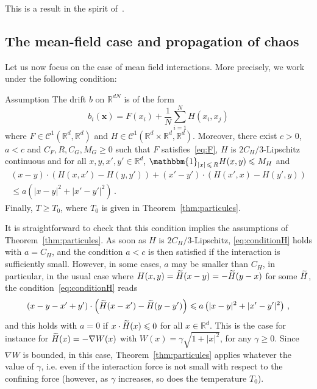 \documentclass[AHL,Unicode,longabstracts,published]{cedram}
\newcommand{\R}{\mathbb R}
\newcommand{\clC}{\mathcal C}
\newcommand{\na}{\nabla}
\newcommand{\1}{\mathbbm{1}}
\newcommand{\bx}{\mathbf{x}}
\let\oldtilde\tilde
\renewcommand*{\tilde}[1]{\mathchoice{\widetilde{#1}}{\widetilde{#1}}{\oldtilde{#1}}{\oldtilde{#1}}}
\newcommand{\R}{\mathbb R}
\begin{document}
This is a result in the spirit of~\cite[Theorem~1]{GuillinWuZhang}.

\subsection{The mean-field case and propagation of chaos}

Let us now focus on the case of mean field interactions. More precisely, we work under the following condition:

\begin{enonce}
{Assumption }\label{AssuChaos}
The drift $b$ on $\R^{dN}$ is of the form
\[
b_i(\bx) = F(x_i) + \frac1N \sum_{i=1}^N H(x_i,x_j)
\]
where $F\in\clC^1 (\R^d,\R^d)$ and $H\in\clC^1(\R^d\times\R^d,\R^d)$. Moreover, there exist $c>0$, $a<c$ and $C_F,R,C_G,M_G\geqslant 0$ such that $F$ satisfies~\eqref{eq:F}, $H$ is $2C_H/3$-Lipschitz continuous and for all $x,y,x',y'\in\R^d$, $\1_{|x|\,\leqslant\,R} H(x,y)\leqslant M_H$ and
\begin{multline}\label{eq:conditionH}
(x-y)\cdot (H(x,x')-H(y,y')) + (x'-y')\cdot (H(x',x)-H(y',y)) \\
\leqslant a\left( |x-y|^2 + |x'-y'|^2\right)\,.
\end{multline}
Finally, $T\geqslant T_0$, where $T_0$ is given in Theorem~\ref{thm:particules}.
\end{enonce}

It is straightforward to check that this condition implies the assumptions of Theorem~\ref{thm:particules}. As soon as $H$ is $2C_H/3$-Lipschitz, \eqref{eq:conditionH} holds with $a=C_H$, and the condition $a<c$ is then satisfied if the interaction is sufficiently small. However, in some cases, $a$ may be smaller than $C_H$, in particular, in the usual case where $H(x,y)=\tilde H(x-y)=-\tilde H(y-x)$ for some $\tilde H$, the condition~\eqref{eq:conditionH} reads
\[
(x-y-x'+y')\cdot \left(\tilde H(x-x')-\tilde H(y-y')\right) \leqslant a\left( |x-y|^2 + |x'-y'|^2\right)\,,
\]
and this holds with $a=0$ if $x\cdot \tilde H(x) \leqslant 0$ for all $x\in\R^d$. This is the case for instance for $\tilde H(x) = -\na W(x)$ with $W(x) = \gamma \sqrt{1+|x|^2}$, for any $\gamma\geqslant 0$. Since $\na W$ is bounded, in this case, Theorem~\ref{thm:particules} applies whatever the value of $\gamma$, i.e. even if the interaction force is not small with respect to the confining force (however, as $\gamma$ increases, so does the temperature $T_0$).
\end{document}
